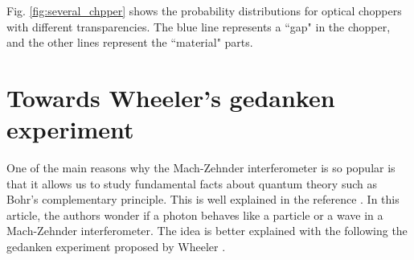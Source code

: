 \documentclass[12pt]{book}
\begin{document}
 

Fig. \ref{fig:several_chpper} shows the probability distributions for optical choppers with different transparencies. The blue line represents a ``gap" in the chopper, and the other lines represent the ``material" parts.
\section{Towards Wheeler's gedanken experiment}

One of the main reasons why the Mach-Zehnder interferometer is so popular is that it allows us to study fundamental facts about quantum theory such as Bohr's complementary principle. This is well explained in the reference \cite{delayed}. In this article, the authors wonder if a photon behaves like a particle or a wave in a Mach-Zehnder interferometer. The idea is better explained with the following the gedanken experiment proposed by Wheeler \cite{delayed}.
\end{document}
